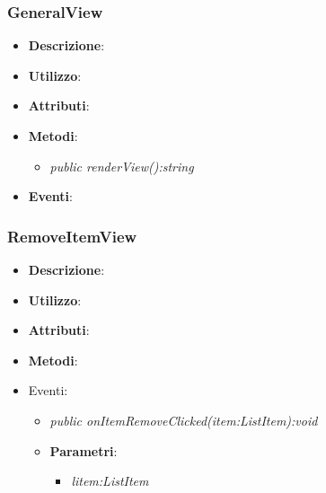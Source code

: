 \subsubsection{GeneralView}
\begin{itemize}
\item \textbf{Descrizione}: 
\item \textbf{Utilizzo}:
\item \textbf{Attributi}: 
\item \textbf{Metodi}:
	\begin{itemize}
	\item \textit{public renderView():string}\\

	\end{itemize}
\item \textbf{Eventi}:
\end{itemize}

\subsubsection{RemoveItemView}
\begin{itemize}
\item \textbf{Descrizione}: 
\item \textbf{Utilizzo}:
\item \textbf{Attributi}: 
\item \textbf{Metodi}:
\item{Eventi}:
	\begin{itemize}	
	\item \textit{public onItemRemoveClicked(item:ListItem):void}\\

			\item{\textbf{Parametri}: \begin{itemize}
			\item \textit{litem:ListItem}\\

			\end{itemize}}
	\end{itemize}
\end{itemize}


